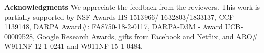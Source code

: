 \documentclass[twoside]{article}
\begin{document}
%

%










\textbf{Acknowledgments} {\small We appreciate the feedback from the reviewers. This work is partially supported by NSF Awards IIS-1513966/ 1632803/1833137, CCF-1139148, DARPA Award\#: FA8750-18-2-0117,  DARPA-D3M - Award UCB-00009528, Google Research Awards, gifts from Facebook and Netflix, and ARO\# W911NF-12-1-0241 and W911NF-15-1-0484.}


 
\end{document}
